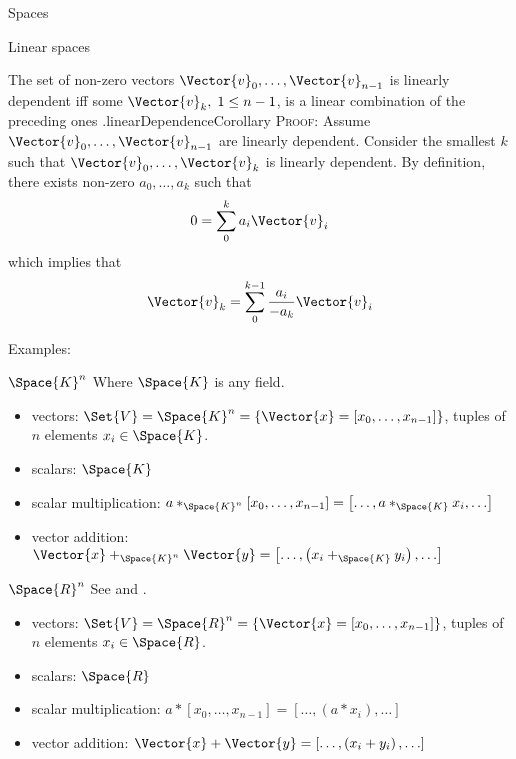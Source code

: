 \begin{plSection}{Spaces}
\begin{plSection}{Linear spaces}
\begin{plCorollary}{The set of non-zero vectors
 $\Vector{v}_0, \ldots ,\Vector{v}_{n-1}$
is linearly dependent iff some $\Vector{v}_k, \; 1 \leq n-1$, 
is a linear combination of the preceding 
ones .}{linearDependenceCorollary}
\textsc{Proof:}
Assume  $\Vector{v}_0, \ldots ,\Vector{v}_{n-1}$ are linearly dependent.
Consider the smallest $k$ such that 
$\Vector{v}_0, \ldots ,\Vector{v}_{k}$ is linearly dependent.
By definition,
there exists non-zero $a_0, \ldots ,a_{k}$ such that
\begin{equation}
0 = \sum_0^k a_i \Vector{v}_i
\end{equation}
which implies that
\begin{equation}
\Vector{v}_k = \sum_0^{k-1} \frac{a_i}{- a_k} \Vector{v}_i
\end{equation}
\end{plCorollary}

Examples:

\begin{plExample}{$\Space{K}^n$}{}
Where $\Space{K}$ is any field.
\begin{itemize}
  \item vectors:
  $\Set{V} = \Space{K}^n = \{ \Vector{x}
  = \left[ x_0, \ldots , x_{n-1} \right] \}$,
  tuples of $n$ elements $x_i \in \Space{K}$.
  \item scalars: $\Space{K}$
  \item scalar multiplication:
  $ a *_{\Space{K}^n} \left[ x_0, \ldots , x_{n-1} \right] =
  \left[ \ldots , a *_{\Space{K}} x_{i} , \ldots \right]$
  \item vector addition:
  $\Vector{x} +_{\Space{K}^n} \Vector{y}
  = \left[ \ldots , \left( x_i +_{\Space{K}} y_i \right) ,\ldots \right]$
\end{itemize}
\end{plExample}

\begin{plExample}{$\Space{R}^n$}{}
See 
and .
\begin{itemize}
  \item vectors:
  $\Set{V} = \Space{R}^n = \{ \Vector{x}
  = \left[ x_0, \ldots , x_{n-1} \right] \}$,
  tuples of $n$ elements $x_i \in \Space{R}$.
  \item scalars: $\Space{R}$
  \item scalar multiplication:
  $ a*\left[ x_0, \ldots , x_{n-1} \right] =
  \left[ \ldots , \left( a*x_i \right) , \ldots \right]$
  \item vector addition:
  $\Vector{x} + \Vector{y}
  = \left[ \ldots , \left( x_i + y_i \right) , \ldots \right]$
\end{itemize}


\end{plExample}
\end{plSection}
\end{plSection}
